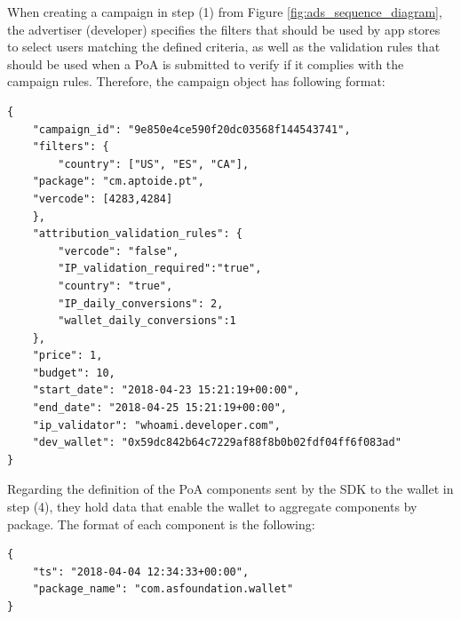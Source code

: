 When creating a campaign in step \textsf{(1)} from Figure \ref{fig:ads_sequence_diagram}, the advertiser (developer) specifies the filters that should be used by app stores to select users matching the defined criteria, as well as the validation rules that should be used when a \textsf{PoA} is submitted to verify if it complies with the campaign rules. Therefore, the campaign object has following format:
\begin{tcolorbox}[enhanced jigsaw,sharp corners, drop fuzzy shadow=ShadowColor]
\begin{lstlisting}[xleftmargin=0.05\textwidth]
{
    "campaign_id": "9e850e4ce590f20dc03568f144543741",
    "filters": {
        "country": ["US", "ES", "CA"],
	"package": "cm.aptoide.pt",
	"vercode": [4283,4284]
    },
    "attribution_validation_rules": {
        "vercode": "false",
        "IP_validation_required":"true",
        "country": "true",
        "IP_daily_conversions": 2,
        "wallet_daily_conversions":1
    },
    "price": 1,
    "budget": 10,
    "start_date": "2018-04-23 15:21:19+00:00",
    "end_date": "2018-04-25 15:21:19+00:00",
    "ip_validator": "whoami.developer.com",
    "dev_wallet": "0x59dc842b64c7229af88f8b0b02fdf04ff6f083ad"
}
\end{lstlisting}
\end{tcolorbox}

Regarding the definition of the \textsf{PoA} components sent by the SDK to the wallet in step \textsf{(4)}, they hold data that enable the wallet to aggregate components by package. The format of each component is the following:
\begin{tcolorbox}[enhanced jigsaw,sharp corners, drop fuzzy shadow=ShadowColor]
\begin{lstlisting}[xleftmargin=0.05\textwidth]
{
    "ts": "2018-04-04 12:34:33+00:00",
    "package_name": "com.asfoundation.wallet"
}
\end{lstlisting}
\end{tcolorbox}

